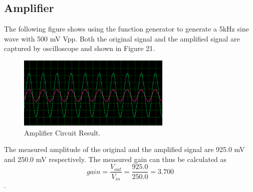 \documentclass [utf8] {article}
\begin{document}
{{	}

	\subsection{Amplifier}
	{
		The following figure shows using the function generator to generate a 5kHz sine wave with 500 mV Vpp. Both the original signal and the ampliﬁed signal are captured by oscilloscope and shown in Figure 21.
		\begin{figure}[H]
			\begin{small}
				\begin{center}
					\includegraphics[width=0.65\textwidth]{figures/Figure21.png}
				\end{center}
				\caption{Amplifier Circuit Result.}
				\label{fig:fig-4-1}
			\end{small}
		\end{figure}
		
		The measured amplitude of the original and the ampliﬁed signal are 925.0 mV and 250.0 mV respectively. The measured gain can thus be calculated as 
		$$gain = \frac{V_{out}}{V_{in}} = \frac{925.0}{250.0} = 3.700$$.
	}	
}
\end{document}
